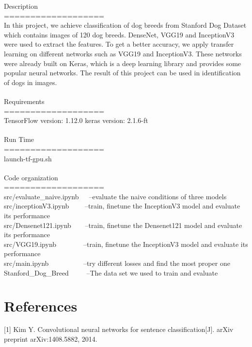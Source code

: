 \documentclass{article}
\begin{document}
Description \\
=================== \\
In this project, we achieve classification of dog breeds from Stanford Dog Dataset which contains images of 120 dog breeds. DenseNet, VGG19 and InceptionV3 were used to extract the features. To get a better accuracy, we apply transfer learning on different networks such as VGG19 and InceptionV3. These networks were already built on Keras, which is a deep learning library and provides some popular neural networks. The result of this project can be used in identification of dogs in images.
\\ \\
Requirements \\
=================== \\
TensorFlow version: 1.12.0
keras      version: 2.1.6-ft
\\ \\ 
Run Time \\ 
=================== \\ 
launch-tf-gpu.sh
\\ \\
Code organization \\ 
=================== \\
src/evaluate\_naive.ipynb $\;\;\;$               --evaluate the naive conditions of three models \\
src/inceptionV3.ipynb $\;\;\;\;\;\;$        --train, finetune the InceptionV3 model and evaluate its performance \\
src/Densenet121.ipynb $\;\;\;\;\;$             --train, finetune the Densenet121 model and evaluate its performance \\
src/VGG19.ipynb      $\;\;\;\;\;\;\;\;\;\;\;\;$             --train, finetune the InceptionV3 model and evaluate its performance \\
src/main.ipynb       $\;\;\;\;\;\;\;\;\;\;\;\;\;\;\;\;$             --try different losses and find the most proper one \\
Stanford\_Dog\_Breed    $\;\;\;\;\;\;\;$            --The data set we used to train and evaluate \\


\section*{References}

\medskip

\small

[1] Kim Y. Convolutional neural networks for sentence classification[J]. arXiv preprint arXiv:1408.5882, 2014.
\end{document}
